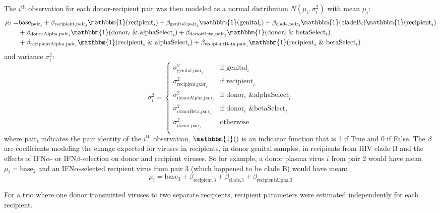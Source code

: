 \documentclass[12pt]{article}
\begin{document}
The $i^\text{th}$ observation for each donor-recipient pair was then modeled as a normal distribution $N(\mu_i,\sigma^2_i)$ with mean $\mu_i$:
\begin{align*}
  \mu_i=&\text{base}_{\text{pair}_i} + \beta_{\text{recipient,pair}_i} \mathbbm{1}(\text{recipient}_i) + \beta_{\text{genital,pair}_i} \mathbbm{1}(\text{genital}_i) + \beta_{\text{clade,pair}_i} \mathbbm{1}(\text{cladeB}_i)\mathbbm{1}(\text{recipient}_i)\\
  &+ \beta_{\text{donorAlpha,pair}_i} \mathbbm{1}(\text{donor}_i \text{ \& alphaSelect}_i) + \beta_{\text{donorBeta,pair}_i} \mathbbm{1}(\text{donor}_i \text{ \& betaSelect}_i) \\
  &+ \beta_{\text{recipientAlpha,pair}_i} \mathbbm{1}(\text{recipient}_i\text{ \& alphaSelect}_i) + \beta_{\text{recipientBeta,pair}_i} \mathbbm{1}(\text{recipient}_i \text{ \& betaSelect}_i) \\
\end{align*}
and variance $\sigma^2_i$:
\[
  \sigma^2_i = \begin{cases}
    \sigma^2_{\text{genital,pair}_i} & \text{if } \text{genital}_i\\
    \sigma^2_{\text{recipient,pair}_i} & \text{if } \text{recipient}_i\\
    \sigma^2_{\text{donorAlpha,pair}_i} & \text{if } \text{donor}_i \text{ \& alphaSelect}_i\\
    \sigma^2_{\text{donorBeta,pair}_i} & \text{if } \text{donor}_i \text{ \& betaSelect}_i\\
    \sigma^2_{\text{donor,pair}_i} & \text{otherwise}\\
  \end{cases}
\]
where pair$_i$ indicates the pair identity of the $i^\text{th}$ observation, $\mathbbm{1}()$ is an indicator function that is 1 if True and 0 if False. The $\beta$ are coefficients modeling the change expected for viruses in recipients, in donor genital samples, in recipients from HIV clade B and the effects of IFN$\alpha$- or IFN$\beta$-selection on donor and recipient viruses. So for example, a donor plasma virus $i$ from pair 2 would have mean $\mu_i = \text{base}_{2}$ and an IFN$\alpha$-selected recipient virus from pair 3 (which happened to be clade B) would have mean:
\[\mu_i=\text{base}_{3} + \beta_{\text{recipient,3}} + \beta_{\text{clade,3}} + \beta_{\text{recipientAlpha,3}}\]

For a trio where one donor transmitted viruses to two separate recipients, recipient parameters were estimated independently for each recipient.
\end{document}
